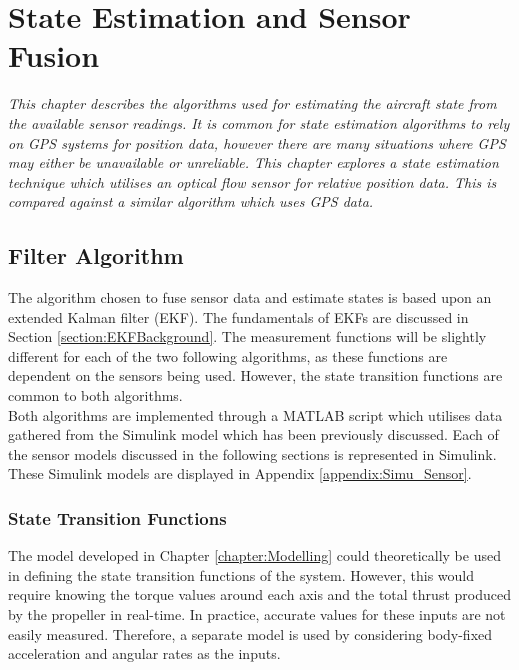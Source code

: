 
\chapter{State Estimation and Sensor Fusion}
\textit{This chapter describes the algorithms used for estimating the aircraft state from the available sensor readings. It is common for state estimation algorithms to rely on GPS systems for position data, however there are many situations where GPS may either be unavailable or unreliable. This chapter explores a state estimation technique which utilises an optical flow sensor for relative position data. This is compared against a similar algorithm which uses GPS data.}

\section{Filter Algorithm}\label{section:Filter}
The algorithm chosen to fuse sensor data and estimate states is based upon an extended Kalman filter (EKF). The fundamentals of EKFs are discussed in Section \ref{section:EKFBackground}. The measurement functions will be slightly different for each of the two following algorithms, as these functions are dependent on the sensors being used. However, the state transition functions are common to both algorithms.\\

Both algorithms are implemented through a MATLAB script which utilises data gathered from the Simulink model which has been previously discussed. Each of the sensor models discussed in the following sections is represented in Simulink. These Simulink models are displayed in Appendix \ref{appendix:Simu_Sensor}. 

\subsection{State Transition Functions}\label{section:StateTrans}
The model developed in Chapter \ref{chapter:Modelling} could theoretically be used in defining the state transition functions of the system. However, this would require knowing the torque values around each axis and the total thrust produced by the propeller in real-time. In practice, accurate values for these inputs are not easily measured. Therefore, a separate model is used by considering body-fixed acceleration and angular rates as the inputs.

